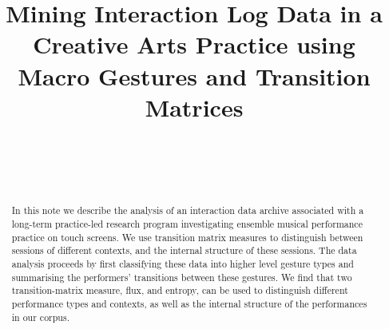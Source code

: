 \documentclass{sigchi}
\begin{document}
 
\title{Mining Interaction Log Data in a Creative Arts Practice using Macro Gestures and Transition Matrices}



\author{%
  \\
  \\
  \\
}

\maketitle

\begin{abstract}

  In this note we describe the analysis of an interaction data archive
  associated with a long-term practice-led research program
  investigating ensemble musical performance practice on touch
  screens. We use transition matrix measures to distinguish between
  sessions of different contexts, and the internal structure of these
  sessions. The data analysis proceeds by first classifying these data
  into higher level gesture types and summarising the performers'
  transitions between these gestures. We find that two
  transition-matrix measure, flux, and entropy, can be used to
  distinguish different performance types and contexts, as well as the
  internal structure of the performances in our corpus.
\end{abstract}

\end{document}

